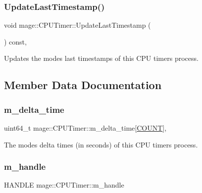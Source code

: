 \subsubsection{\texorpdfstring{Update\+Last\+Timestamp()}{UpdateLastTimestamp()}}
{\footnotesize\ttfamily void mage\+::\+C\+P\+U\+Timer\+::\+Update\+Last\+Timestamp (\begin{DoxyParamCaption}{ }\end{DoxyParamCaption}) const\hspace{0.3cm}{\ttfamily [private]}, {\ttfamily [noexcept]}}

Updates the modes\textquotesingle{} last timestamps of this C\+PU timer\textquotesingle{}s process. 

\subsection{Member Data Documentation}
\hypertarget{classmage_1_1_c_p_u_timer_a764d94b0a2392cbb98bd675f547f671d}{}\label{classmage_1_1_c_p_u_timer_a764d94b0a2392cbb98bd675f547f671d} 
\subsubsection{\texorpdfstring{m\+\_\+delta\+\_\+time}{m\_delta\_time}}
{\footnotesize\ttfamily uint64\+\_\+t mage\+::\+C\+P\+U\+Timer\+::m\+\_\+delta\+\_\+time\mbox{[}\hyperlink{classmage_1_1_c_p_u_timer_a95a81bb0f32d2cc9881f311a0f6fa895a780a9a1245e4e551833ba02eb606bdf8}{C\+O\+U\+NT}\mbox{]}\hspace{0.3cm}{\ttfamily [mutable]}, {\ttfamily [private]}}

The modes\textquotesingle{} delta times (in seconds) of this C\+PU timer\textquotesingle{}s process. \hypertarget{classmage_1_1_c_p_u_timer_a95b8ac18c050ed25293c8a923087369a}{}\label{classmage_1_1_c_p_u_timer_a95b8ac18c050ed25293c8a923087369a} 
\subsubsection{\texorpdfstring{m\+\_\+handle}{m\_handle}}
{\footnotesize\ttfamily H\+A\+N\+D\+LE mage\+::\+C\+P\+U\+Timer\+::m\+\_\+handle\hspace{0.3cm}{\ttfamily [private]}}

